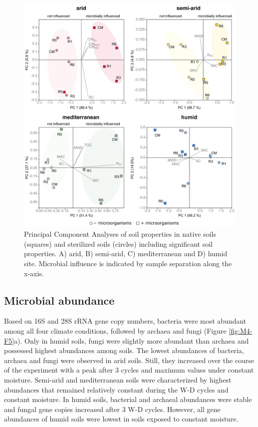 \begin{figure}[H]
	\centering
	\includegraphics[width=1\textwidth]{img/M4-Figure_4.jpg}
	\caption[Principal Component Analyses of soil properties in native soils and sterilized soils including significant soil properties]{Principal Component Analyses of soil properties in native soils (squares) and sterilized soils (circles) including significant soil properties. A) arid, B) semi-arid, C) mediterranean and D) humid site. Microbial influence is indicated by sample separation along the x-axis.}
	\label{fig:M4-F4}
\end{figure}

\subsection{Microbial abundance}

Based on 16S and 28S rRNA gene copy numbers, bacteria were most abundant among all four climate conditions, followed by archaea and fungi (Figure \ref{fig:M4-F5}a). Only in humid soils, fungi were slightly more abundant than archaea and possessed highest abundances among soils. The lowest abundances of bacteria, archaea and fungi were observed in arid soils. Still, they increased over the course of the experiment with a peak after 3 cycles and maximum values under constant moisture. Semi-arid and mediterranean soils were characterized by highest abundances that remained relatively constant during the W-D cycles and constant moisture. In humid soils, bacterial and archaeal abundances were stable and fungal gene copies increased after 3 W-D cycles. However, all gene abundances of humid soils were lowest in soils exposed to constant moisture.

